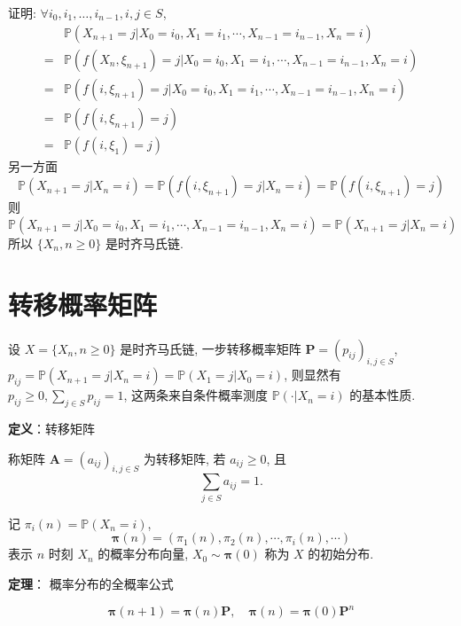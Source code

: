\documentclass[openany]{ctexbook}
\theoremstyle{kaiti}
\theoremstyle{normal}
\begin{document}
证明: $\forall i_0,i_1,\ldots,i_{n-1},i,j\in S$,
\begin{equation}
  \begin{aligned}
    & \mathbb{P}(X_{n+1}=j|X_0=i_0,X_1=i_1,\cdots,X_{n-1}=i_{n-1},X_n=i)\\
    =& \mathbb{P}(f(X_n,\xi_{n+1})=j|X_0=i_0,X_1=i_1,\cdots,X_{n-1}=i_{n-1},X_n=i)\\
    =& \mathbb{P}(f(i,\xi_{n+1})=j|X_0=i_0,X_1=i_1,\cdots,X_{n-1}=i_{n-1},X_n=i)\\
    =& \mathbb{P}(f(i,\xi_{n+1})=j)\\
    =& \mathbb{P}(f(i,\xi_1)=j)
  \end{aligned}
\end{equation} 另一方面 
\begin{equation}
  \mathbb{P}(X_{n+1}=j|X_n=i)=\mathbb{P}(f(i,\xi_{n+1})=j|X_n=i)=\mathbb{P}(f(i,\xi_{n+1})=j) 
\end{equation} 则 
\begin{equation}
  \mathbb{P}(X_{n+1}=j|X_0=i_0,X_1=i_1,\cdots,X_{n-1}=i_{n-1},X_n=i)=\mathbb{P}(X_{n+1}=j|X_n=i) 
\end{equation} 所以 $\{X_n,n\geqslant0\}$ 是时齐马氏链.

\section{转移概率矩阵}

设 $X=\{X_n,n\geqslant0\}$ 是时齐马氏链, 一步转移概率矩阵 $\bm{P}=(p_{ij})_{i,j\in S}$, $p_{ij}=\mathbb{P}(X_{n+1}=j|X_n=i)=\mathbb{P}(X_1=j|X_0=i)$, 则显然有 $p_{ij}\geqslant0,\sum_{j\in S}p_{ij}=1$, 这两条来自条件概率测度 $\mathbb{P}(\cdot|X_n=i)$ 的基本性质.

\textbf{定义}：转移矩阵

称矩阵 $\bm{A}=(a_{ij})_{i,j\in S}$ 为转移矩阵, 若 $a_{ij}\geqslant0$, 且
\begin{equation}
  \sum_{j\in S}a_{ij}=1.
\end{equation}

记 $\pi_i(n)=\mathbb{P}(X_n=i)$,
\begin{equation}
  \bm{\pi}(n)=(\pi_1(n),\pi_2(n),\cdots,\pi_i(n),\cdots)
\end{equation}
表示 $n$ 时刻 $X_n$ 的概率分布向量, $X_0\sim\bm{\pi}(0)$ 称为 $X$ 的初始分布.

\textbf{定理}： 概率分布的全概率公式

\begin{equation}\bm{\pi}(n+1)=\bm{\pi}(n)\bm{P},\quad \bm{\pi}(n)=\bm{\pi}(0)\bm{P}^n\end{equation}
\end{document}
